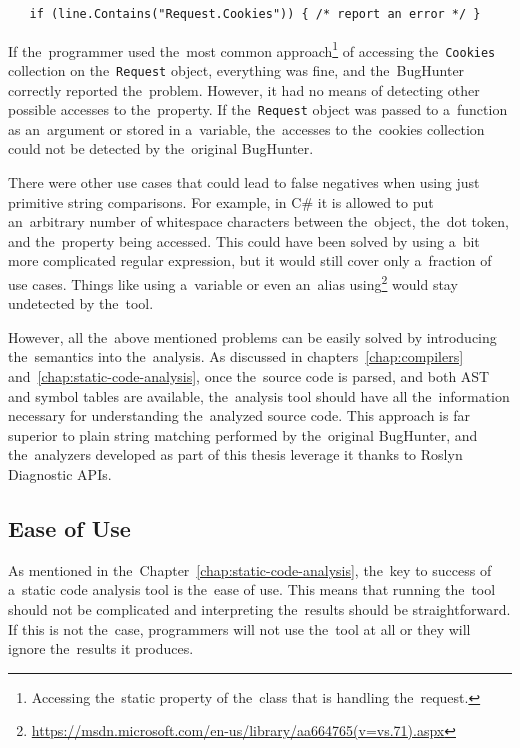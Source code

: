 \documentclass[
  digital, %
  table,   %
  lof,     %
  lot,     %
  oneside,
]{fithesis3}
\begin{document}
\begin{verbatim}
   if (line.Contains("Request.Cookies")) { /* report an error */ }
\end{verbatim}


If the~programmer used the~most common approach\footnote{Accessing the~static property of the~class that is handling the~request.} of accessing the~\texttt{Cookies} collection on the~\texttt{Request} object, everything was fine, and the~BugHunter correctly reported the~problem. However, it had no means of detecting other possible accesses to the~property. If the~\texttt{Request} object was passed to a~function as an~argument or stored in a~variable, the~accesses to the~cookies collection could not be detected by the~original BugHunter. 

There were other use cases that could lead to false negatives when using just primitive string comparisons. For example, in C\# it is allowed to put an~arbitrary number of whitespace characters between the~object, the~dot token, and the~property being accessed. This could have been solved by using a~bit more complicated regular expression, but it would still cover only a~fraction of use cases. Things like using a~variable or even an~alias using\footnote{\url{https://msdn.microsoft.com/en-us/library/aa664765(v=vs.71).aspx}} would stay undetected by the~tool. 

However, all the~above mentioned problems can be easily solved by introducing the~semantics into the~analysis. As discussed in chapters~\ref{chap:compilers} and~\ref{chap:static-code-analysis}, once the~source code is parsed, and both AST and symbol tables are available, the~analysis tool should have all the~information necessary for understanding the~analyzed source code. This approach is far superior to plain string matching performed by the~original BugHunter, and the~analyzers developed as part of this thesis leverage it thanks to Roslyn Diagnostic APIs.

\subsection{Ease of Use}
As mentioned in the~Chapter~\ref{chap:static-code-analysis}, the~key to success of a~static code analysis tool is the~ease of use. This means that running the~tool should not be complicated and interpreting the~results should be straightforward. If this is not the~case, programmers will not use the~tool at all or they will ignore the~results it produces. 
\end{document}
